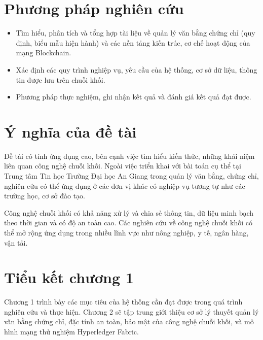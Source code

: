 \section{Phương pháp nghiên cứu}

\begin{itemize}
\item Tìm hiểu, phân tích và tổng hợp tài liệu về quản lý văn bằng chứng chỉ (quy định, biểu mẫu hiện hành) và các nền tảng kiến trúc, cơ chế hoạt động của mạng Blockchain.
\item Xác định các quy trình nghiệp vụ, yêu cầu của hệ thống, cơ sở dữ liệu, thông tin được lưu trên chuỗi khối.
\item Phương pháp thực nghiệm, ghi nhận kết quả và đánh giá kết quả đạt được.
\end{itemize}
\section{Ý nghĩa của đề tài}


Đề tài có tính ứng dụng cao, bên cạnh việc tìm hiểu kiến thức, những khái niệm liên quan công nghệ chuỗi khối.
Ngoài việc triển khai với bài toán cụ thể tại Trung tâm Tin học Trường Đại học An Giang trong quản lý văn bằng, chứng chỉ, nghiên cứu có thể ứng dụng ở các đơn vị khác có nghiệp vụ tương tự như các trường học, cơ sở đào tạo.

Công nghệ chuỗi khối có khả năng xử lý và chia sẻ thông tin, dữ liệu minh bạch theo thời gian và có độ an toàn cao. Các nghiên cứu về công nghệ chuỗi khối có thể mở rộng ứng dụng trong nhiều lĩnh vực như nông nghiệp, y tế, ngân hàng, vận tải.
\section{Tiểu kết chương 1}

Chương 1 trình bày các mục tiêu của hệ thống cần đạt được trong quá trình nghiên cứu và thực hiện. Chương 2 sẽ tập trung giới thiệu cơ sở lý thuyết quản lý văn bằng chứng chỉ, đặc tính an toàn, bảo mật của công nghệ chuỗi khối, và mô hình mạng thử nghiệm Hyperledger Fabric.